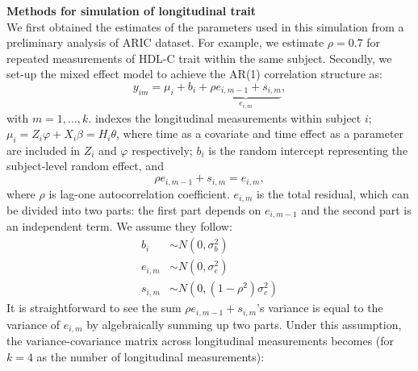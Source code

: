 \documentclass[12pt]{article}
\begin{document}
\textbf{Methods for simulation of longitudinal trait}\\
We first obtained the estimates of the parameters used in this simulation from a preliminary analysis of ARIC dataset. For example, we estimate $\rho = 0.7$ for repeated measurements of HDL-C trait within the same subject. Secondly, we set-up the mixed effect model to achieve the AR(1) correlation structure as:\\
\begin{equation}
y_{im} = \mu_{i} + b_i + \underbrace{ \rho e_{i,m-1} + s_{i,m} }_{ e_{i,m} }  ,
\label{eq:y_im_split}
\end{equation}
with $m = 1,\ldots,k.$ indexes the longitudinal measurements within subject $i$; $\mu_{i} = Z_i \varphi + X_i \beta = H_i \theta$, where time as a covariate and time effect as a parameter are included in $Z_i$ and $\varphi$ respectively; $b_i$ is the random intercept representing the subject-level random effect, and
$$
\rho e_{i,m-1} + s_{i,m} = e_{i,m},
$$ 
where $\rho$ is lag-one autocorrelation coefficient.
$e_{i,m}$ is the total residual, which can be divided into two parts: the first part depends on $e_{i,m-1}$ and the second part is an independent term. We assume they follow:\\
\begin{align*}
b_i & \sim N(0,\sigma_b^2)\\
e_{i,m} & \sim  N(0, \sigma_e^2)\\
s_{i,m} & \sim  N(0, (1 - \rho^2) \sigma_e^2 )
\end{align*}
It is straightforward to see the sum $\rho e_{i,m-1} + s_{i,m}$'s variance is equal to the variance of $e_{i,m}$ by algebraically summing up two parts. Under this assumption, the variance-covariance matrix across longitudinal measurements becomes (for $k = 4$ as the number of longitudinal measurements):
\end{document}
